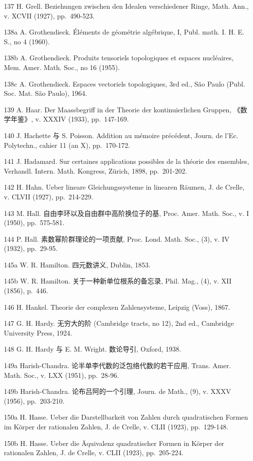 137 H. Grell. Beziehungen zwischen den Idealen verschiedener Ringe, Math. Ann., v. XCVII (1927), pp.~490-523.

138a A. Grothendieck. Éléments de géométrie algébrique, I, Publ. math. I. H. E. S., no 4 (1960).

138b A. Grothendieck. Produits tensoriels topologiques et espaces nucléaires, Mem. Amer. Math. Soc., no 16 (1955).

138c A. Grothendieck. Espaces vectoriels topologiques, 3rd ed., São Paulo (Publ. Soc. Mat. São Paulo), 1964.

139 A. Haar. Der Maassbegriff in der Theorie der kontinuierlichen Gruppen, 《数学年鉴》, v. XXXIV (1933), pp.~147-169.

140 J. Hachette 与 S. Poisson. Addition au mémoire précédent, Journ. de l'Ec. Polytechn., cahier 11 (an X), pp.~170-172.

141 J. Hadamard. Sur certaines applications possibles de la théorie des ensembles, Verhandl. Intern. Math. Kongress, Zürich, 1898, pp.~201-202.

142 H. Hahn. Ueber lineare Gleichungssysteme in linearen Räumen, J. de Crelle, v. CLVII (1927), pp.~214-229.

143 M. Hall. 自由李环以及自由群中高阶换位子的基, Proc. Amer. Math. Soc., v. I (1950), pp.~575-581.

144 P. Hall. 素数幂阶群理论的一项贡献, Proc. Lond. Math. Soc., (3), v. IV (1932), pp.~29-95.

145a W. R. Hamilton. 四元数讲义, Dublin, 1853.

145b W. R. Hamilton. 关于一种新单位根系的备忘录, Phil. Mag., (4), v. XII (1856), p.~446.

146 H. Hankel. Theorie der complexen Zahlensysteme, Leipzig (Voss), 1867.

147 G. H. Hardy. 无穷大的阶 (Cambridge tracts, no 12), 2nd ed., Cambridge University Press, 1924.

148 G. H. Hardy 与 E. M. Wright. 数论导引, Oxford, 1938.

149a Harish-Chandra. 论半单李代数的泛包络代数的若干应用, Trans. Amer. Math. Soc., v. LXX (1951), pp.~28-96.

149b Harish-Chandra. 论布吕阿的一个引理, Journ. de Math., (9), v. XXXV (1956), pp.~203-210.

150a H. Hasse. Ueber die Darstellbarkeit von Zahlen durch quadratischen Formen im Körper der rationalen Zahlen, J. de Crelle, v. CLII (1923), pp.~129-148.

150b H. Hasse. Ueber die Äquivalenz quadratischer Formen in Körper der rationalen Zahlen, J. de Crelle, v. CLII (1923), pp.~205-224.

